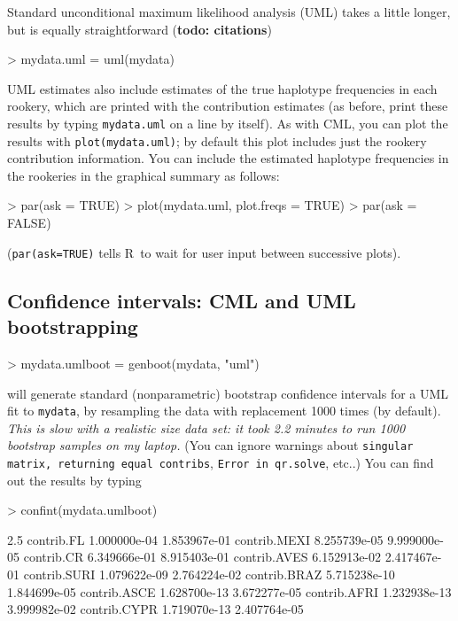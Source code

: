 \documentclass[11pt]{article}
\newcommand{\R}{{\sf R}}
\newcommand{\code}[1]{{\tt #1}}
\begin{document}
Standard unconditional maximum likelihood analysis (UML)
takes a little longer, but is equally straightforward
(\textbf{todo: citations})
\begin{Schunk}
\begin{Sinput}
> mydata.uml = uml(mydata)
\end{Sinput}
\end{Schunk}

UML estimates also include estimates of the true
haplotype frequencies in each rookery, which are
printed with the contribution estimates 
(as before, print these results by typing \code{mydata.uml} 
on a line by
itself).
As with CML, you can plot the results with
\code{plot(mydata.uml)}; by default this plot
includes just the rookery contribution
information.
You can include the estimated haplotype
frequencies in the rookeries in the graphical summary as follows:
\begin{Schunk}
\begin{Sinput}
> par(ask = TRUE)
> plot(mydata.uml, plot.freqs = TRUE)
> par(ask = FALSE)
\end{Sinput}
\end{Schunk}
(\code{par(ask=TRUE)} tells \R\ to wait
for user input between successive plots).

\subsection{Confidence intervals:
CML and UML bootstrapping}
\begin{Schunk}
\begin{Sinput}
> mydata.umlboot = genboot(mydata, "uml")
\end{Sinput}
\end{Schunk}
will generate standard (nonparametric)
bootstrap confidence intervals for
a UML fit to \code{mydata}, by resampling
the data with replacement 1000 times (by default).
\emph{This is slow with a realistic size
data set: it took 2.2
minutes to run 1000 bootstrap samples
on my laptop.}
(You can ignore warnings about {\tt singular matrix, returning
equal contribs}, {\tt Error in qr.solve}, etc..)
You can find out the results by typing
\begin{Schunk}
\begin{Sinput}
> confint(mydata.umlboot)
\end{Sinput}
\begin{Soutput}
                     2.5%
contrib.FL   1.000000e-04 1.853967e-01
contrib.MEXI 8.255739e-05 9.999000e-05
contrib.CR   6.349666e-01 8.915403e-01
contrib.AVES 6.152913e-02 2.417467e-01
contrib.SURI 1.079622e-09 2.764224e-02
contrib.BRAZ 5.715238e-10 1.844699e-05
contrib.ASCE 1.628700e-13 3.672277e-05
contrib.AFRI 1.232938e-13 3.999982e-02
contrib.CYPR 1.719070e-13 2.407764e-05
\end{Soutput}
\end{Schunk}
\end{document}
